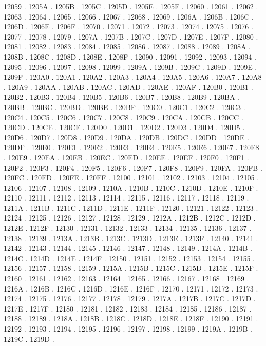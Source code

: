 12059 .
1205A .
1205B .
1205C .
1205D .
1205E .
1205F .
12060 .
12061 .
12062 .
12063 .
12064 .
12065 .
12066 .
12067 .
12068 .
12069 .
1206A .
1206B .
1206C .
1206D .
1206E .
1206F .
12070 .
12071 .
12072 .
12073 .
12074 .
12075 .
12076 .
12077 .
12078 .
12079 .
1207A .
1207B .
1207C .
1207D .
1207E .
1207F .
12080 .
12081 .
12082 .
12083 .
12084 .
12085 .
12086 .
12087 .
12088 .
12089 .
1208A .
1208B .
1208C .
1208D .
1208E .
1208F .
12090 .
12091 .
12092 .
12093 .
12094 .
12095 .
12096 .
12097 .
12098 .
12099 .
1209A .
1209B .
1209C .
1209D .
1209E .
1209F .
120A0 .
120A1 .
120A2 .
120A3 .
120A4 .
120A5 .
120A6 .
120A7 .
120A8 .
120A9 .
120AA .
120AB .
120AC .
120AD .
120AE .
120AF .
120B0 .
120B1 .
120B2 .
120B3 .
120B4 .
120B5 .
120B6 .
120B7 .
120B8 .
120B9 .
120BA .
120BB .
120BC .
120BD .
120BE .
120BF .
120C0 .
120C1 .
120C2 .
120C3 .
120C4 .
120C5 .
120C6 .
120C7 .
120C8 .
120C9 .
120CA .
120CB .
120CC .
120CD .
120CE .
120CF .
120D0 .
120D1 .
120D2 .
120D3 .
120D4 .
120D5 .
120D6 .
120D7 .
120D8 .
120D9 .
120DA .
120DB .
120DC .
120DD .
120DE .
120DF .
120E0 .
120E1 .
120E2 .
120E3 .
120E4 .
120E5 .
120E6 .
120E7 .
120E8 .
120E9 .
120EA .
120EB .
120EC .
120ED .
120EE .
120EF .
120F0 .
120F1 .
120F2 .
120F3 .
120F4 .
120F5 .
120F6 .
120F7 .
120F8 .
120F9 .
120FA .
120FB .
120FC .
120FD .
120FE .
120FF .
12100 .
12101 .
12102 .
12103 .
12104 .
12105 .
12106 .
12107 .
12108 .
12109 .
1210A .
1210B .
1210C .
1210D .
1210E .
1210F .
12110 .
12111 .
12112 .
12113 .
12114 .
12115 .
12116 .
12117 .
12118 .
12119 .
1211A .
1211B .
1211C .
1211D .
1211E .
1211F .
12120 .
12121 .
12122 .
12123 .
12124 .
12125 .
12126 .
12127 .
12128 .
12129 .
1212A .
1212B .
1212C .
1212D .
1212E .
1212F .
12130 .
12131 .
12132 .
12133 .
12134 .
12135 .
12136 .
12137 .
12138 .
12139 .
1213A .
1213B .
1213C .
1213D .
1213E .
1213F .
12140 .
12141 .
12142 .
12143 .
12144 .
12145 .
12146 .
12147 .
12148 .
12149 .
1214A .
1214B .
1214C .
1214D .
1214E .
1214F .
12150 .
12151 .
12152 .
12153 .
12154 .
12155 .
12156 .
12157 .
12158 .
12159 .
1215A .
1215B .
1215C .
1215D .
1215E .
1215F .
12160 .
12161 .
12162 .
12163 .
12164 .
12165 .
12166 .
12167 .
12168 .
12169 .
1216A .
1216B .
1216C .
1216D .
1216E .
1216F .
12170 .
12171 .
12172 .
12173 .
12174 .
12175 .
12176 .
12177 .
12178 .
12179 .
1217A .
1217B .
1217C .
1217D .
1217E .
1217F .
12180 .
12181 .
12182 .
12183 .
12184 .
12185 .
12186 .
12187 .
12188 .
12189 .
1218A .
1218B .
1218C .
1218D .
1218E .
1218F .
12190 .
12191 .
12192 .
12193 .
12194 .
12195 .
12196 .
12197 .
12198 .
12199 .
1219A .
1219B .
1219C .
1219D .
